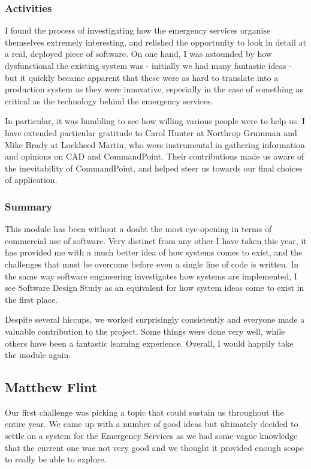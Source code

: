 \documentclass[]{article}
\begin{document}
    \subsubsection*{Activities}

    I found the process of investigating how the emergency services organise themselves extremely interesting, and relished the opportunity to look in detail at a real, deployed piece of software. On one hand, I was astounded by how dysfunctional the existing system was - initially we had many fantastic ideas - but it quickly became apparent that these were as hard to translate into a production system as they were innovative, especially in the case of something as critical as the technology behind the emergency services.

    In particular, it was humbling to see how willing various people were to help us. I have extended particular gratitude to Carol Hunter at Northrop Grumman and Mike Brady at Lockheed Martin, who were instrumental in gathering information and opinions on CAD and CommandPoint. Their contributions made us aware of the inevitability of CommandPoint, and helped steer us towards our final choices of application.

    \subsubsection*{Summary}

    This module has been without a doubt the most eye-opening in terms of commercial use of software. Very distinct from any other I have taken this year, it has provided me with a much better idea of how systems comes to exist, and the challenges that must be overcome before even a single line of code is written. In the same way software engineering investigates how systems are implemented, I see Software Design Study as an equivalent for how system ideas come to exist in the first place.

    Despite several hiccups, we worked surprisingly consistently and everyone made a valuable contribution to the project. Some things were done very well, while others have been a fantastic learning experience. Overall, I would happily take the module again.

    \pagebreak
    \subsection{Matthew Flint}
    Our first challenge was picking a topic that could sustain us throughout the entire year. We came up with a number of good ideas but ultimately decided to settle on a system for the Emergency Services as we had some vague knowledge that the current one was not very good and we thought it provided enough scope to really be able to explore.\\
\end{document}
